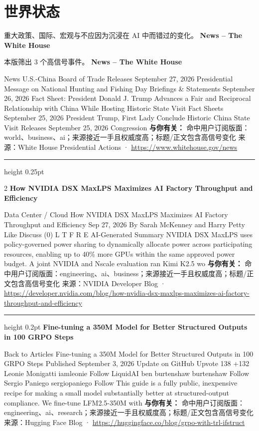 \documentclass[10.5pt]{ctexart}
\begin{document}
\section*{世界状态}
{\color{ormuted} 重大政策、国际、宏观与不应因为沉浸在 AI 中而错过的变化。}
\vspace{2mm}
{\LARGE\bfseries News – The White House}\par
\vspace{1mm}
{\color{ormuted} 本版筛出 3 个高信号事件。}
\vspace{3mm}
{\Large\bfseries News – The White House}\par
News U.S.-China Board of Trade Releases September 27, 2026 Presidential Message on National Hunting and Fishing Day Briefings \& Statements September 26, 2026 Fact Sheet: President Donald J. Trump Advances a Fair and Reciprocal Relationship with China While Hosting Historic State Visit Fact Sheets September 25, 2026 President Trump, First Lady Conclude Historic China State Visit Releases September 25, 2026 Congression
\textbf{与你有关：} 命中用户订阅版面：world、business、ai；来源接近一手且权威度高；标题/正文包含高信号变化
{\footnotesize\color{ormuted} 来源：White House Presidential Actions · \url{https://www.whitehouse.gov/news}}
\vspace{4mm}
\hrule height 0.25pt
\vspace{3mm}
\begin{multicols}{2}
{\large\bfseries How NVIDIA DSX MaxLPS Maximizes AI Factory Throughput and Efficiency}\par
Data Center / Cloud How NVIDIA DSX MaxLPS Maximizes AI Factory Throughput and Efficiency Sep 27, 2026 By Sarah McKenney and Harry Petty Like Discuss (0) L T F R E AI-Generated Summary NVIDIA DSX MaxLPS uses policy-governed power sharing to dynamically allocate power across participating resources, enabling up to 40\% more GPUs within the same approved power budget. A joint NVIDIA and Nscale evaluation ran Kimi K2.5 wo
\textbf{与你有关：} 命中用户订阅版面：engineering、ai、business；来源接近一手且权威度高；标题/正文包含高信号变化
{\footnotesize\color{ormuted} 来源：NVIDIA Developer Blog · \url{https://developer.nvidia.com/blog/how-nvidia-dsx-maxlps-maximizes-ai-factory-throughput-and-efficiency}}
\vspace{2mm}
\hrule height 0.2pt
\vspace{2mm}
{\large\bfseries Fine-tuning a 350M Model for Better Structured Outputs in 100 GRPO Steps}\par
Back to Articles Fine-tuning a 350M Model for Better Structured Outputs in 100 GRPO Steps Published September 3, 2026 Update on GitHub Upvote 138 +132 Leonie Monigatti iamleonie Follow LiquidAI ben burtenshaw burtenshaw Follow Sergio Paniego sergiopaniego Follow This guide is a fully public, inexpensive recipe for making a small model substantially better at structured-output compliance. We fine-tune LFM2.5-350M with
\textbf{与你有关：} 命中用户订阅版面：engineering、ai、research；来源接近一手且权威度高；标题/正文包含高信号变化
{\footnotesize\color{ormuted} 来源：Hugging Face Blog · \url{https://huggingface.co/blog/grpo-with-trl-ifstruct}}
\end{multicols}
\end{document}
